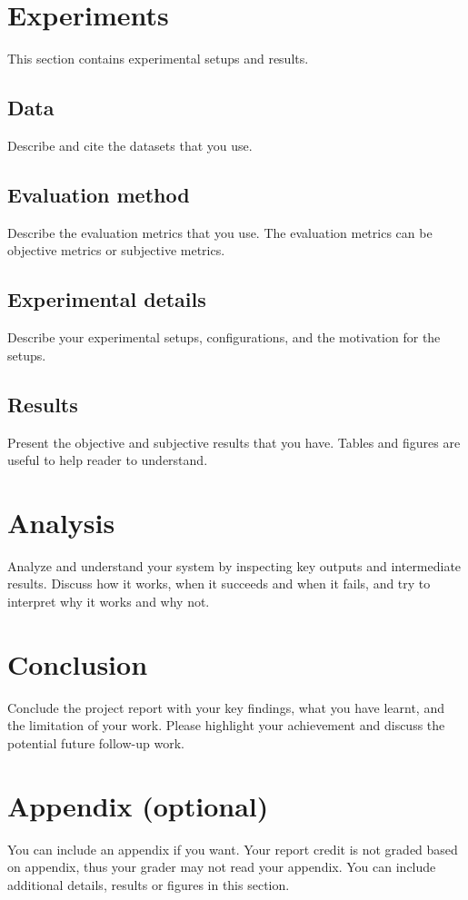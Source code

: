 \documentclass{article}
\begin{document}
\section{Experiments}
This section contains experimental setups and results.

\subsection{Data}
Describe and cite the datasets that you use.


\subsection{Evaluation method}
Describe the evaluation metrics that you use. The evaluation metrics can be objective metrics or subjective metrics.

\subsection{Experimental details}
Describe your experimental setups, configurations, and the motivation for the setups.

\subsection{Results}

Present the objective and subjective results that you have. Tables and figures are useful to help reader to understand.


\section{Analysis}
Analyze and understand your system by inspecting key outputs and intermediate results. Discuss how it works, when it succeeds and when it fails, and try to interpret why it works and why not.

\section{Conclusion}

Conclude the project report with your key findings, what you have learnt, and the limitation of your work. Please highlight your achievement and discuss the potential future follow-up work.




\appendix

\section{Appendix (optional)}

You can include an appendix if you want. Your report credit is not graded based on appendix, thus your grader may not read your appendix. You can include additional details, results or figures in this section.
\end{document}

